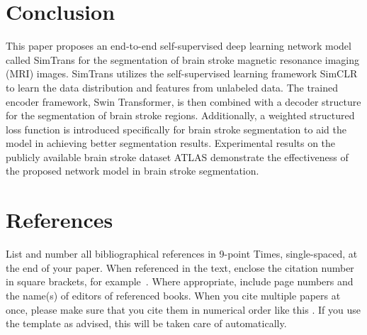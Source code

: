 \documentclass[10pt,twocolumn,letterpaper]{article}
\begin{document}

\section{Conclusion}
\label{sec:conclusion}

This paper proposes an end-to-end self-supervised deep learning network model called SimTrans for the segmentation of brain stroke magnetic resonance imaging (MRI) images. SimTrans utilizes the self-supervised learning framework SimCLR to learn the data distribution and features from unlabeled data. The trained encoder framework, Swin Transformer, is then combined with a decoder structure for the segmentation of brain stroke regions. Additionally, a weighted structured loss function is introduced specifically for brain stroke segmentation to aid the model in achieving better segmentation results. Experimental results on the publicly available brain stroke dataset ATLAS demonstrate the effectiveness of the proposed network model in brain stroke segmentation.

\section{References}
\label{sec:references}

List and number all bibliographical references in 9-point Times, single-spaced, at the end of your paper.
When referenced in the text, enclose the citation number in square brackets, for
example~\cite{Authors14}.
Where appropriate, include page numbers and the name(s) of editors of referenced books.
When you cite multiple papers at once, please make sure that you cite them in numerical order like this \cite{Alpher02,Alpher03,Alpher05,Authors14b,Authors14}.
If you use the template as advised, this will be taken care of automatically.



{\small


}
\end{document}
